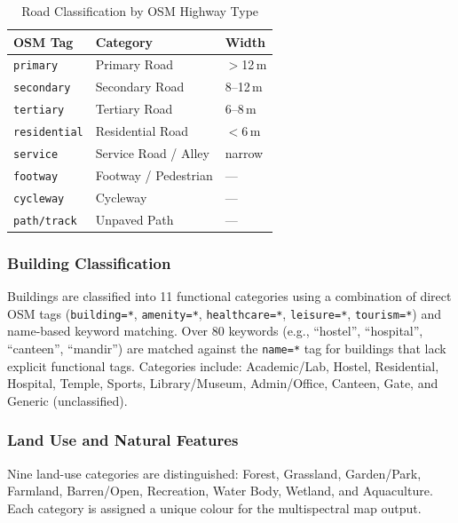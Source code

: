 \documentclass[conference]{IEEEtran}
\begin{document}
\begin{table}[htbp]
\caption{Road Classification by OSM Highway Type}
\begin{center}
\begin{tabular}{|l|l|l|}
\hline
\textbf{OSM Tag} & \textbf{Category} & \textbf{Width} \\
\hline
\texttt{primary} & Primary Road & $>$12\,m \\
\hline
\texttt{secondary} & Secondary Road & 8--12\,m \\
\hline
\texttt{tertiary} & Tertiary Road & 6--8\,m \\
\hline
\texttt{residential} & Residential Road & $<$6\,m \\
\hline
\texttt{service} & Service Road / Alley & narrow \\
\hline
\texttt{footway} & Footway / Pedestrian & --- \\
\hline
\texttt{cycleway} & Cycleway & --- \\
\hline
\texttt{path/track} & Unpaved Path & --- \\
\hline
\end{tabular}
\label{tab:roads}
\end{center}
\end{table}

\subsubsection{Building Classification}

Buildings are classified into 11 functional categories using a combination of direct OSM tags (\texttt{building=*}, \texttt{amenity=*}, \texttt{healthcare=*}, \texttt{leisure=*}, \texttt{tourism=*}) and name-based keyword matching. Over 80 keywords (e.g., ``hostel'', ``hospital'', ``canteen'', ``mandir'') are matched against the \texttt{name=*} tag for buildings that lack explicit functional tags. Categories include: Academic/Lab, Hostel, Residential, Hospital, Temple, Sports, Library/Museum, Admin/Office, Canteen, Gate, and Generic (unclassified).

\subsubsection{Land Use and Natural Features}

Nine land-use categories are distinguished: Forest, Grassland, Garden/Park, Farmland, Barren/Open, Recreation, Water Body, Wetland, and Aquaculture. Each category is assigned a unique colour for the multispectral map output.
\end{document}

